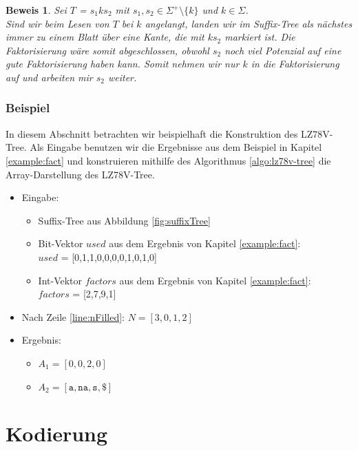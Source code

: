 \documentclass[a4paper,11pt]{scrartcl}%
\theoremstyle{change}
\theoremstyle{nonumberplain}
\theoremstyle{change}
\theoremstyle{nonumberplain}
\newtheorem{beweis}{Beweis}
\theoremstyle{change}
\theoremstyle{nonumberplain}
\begin{document}
\begin{beweis}
	Sei $T$ = $s_1ks_2$ mit $s_1,s_2 \in \Sigma^+ \setminus \{k\}$ und $k \in \Sigma$. \\
	Sind wir beim Lesen von $T$ bei $k$ angelangt, landen wir im Suffix-Tree als nächstes immer zu einem Blatt über eine Kante, die mit $ks_2$ markiert ist.
	Die Faktorisierung wäre somit abgeschlossen, obwohl $s_2$ noch viel Potenzial auf eine gute Faktorisierung haben kann. Somit nehmen wir nur $k$ in die Faktorisierung auf und arbeiten mir $s_2$ weiter.
\end{beweis}

\subsubsection{Beispiel}

In diesem Abschnitt betrachten wir beispielhaft die Konstruktion des LZ78V-Tree. Als Eingabe benutzen wir die Ergebnisse aus dem Beispiel in Kapitel \ref{example:fact} und konstruieren mithilfe des Algorithmus \ref{algo:lz78v-tree} die Array-Darstellung des LZ78V-Tree.\\

\begin{itemize}
\item Eingabe: 
	\begin{itemize}
		\item Suffix-Tree aus Abbildung \ref{fig:suffixTree}
		\item Bit-Vektor $used$ aus dem Ergebnis von Kapitel \ref{example:fact}: \\
		$used$ = [0,1,1,0,0,0,0,1,0,1,0]
		\item Int-Vektor $factors$ aus dem Ergebnis von Kapitel \ref{example:fact}: \\
		$factors$ = [2,7,9,1]
	\end{itemize}
	
\item Nach Zeile \ref{line:nFilled}: $N = [3,0,1,2]$
\item Ergebnis:
	\begin{itemize}
		\item $A_1 = [0 ,0 , 2, 0]$
		\item $A_2 = [\texttt{a}, \texttt{na}, \texttt{s}, \texttt{\$}]$
	\end{itemize}
\end{itemize}

\section{Kodierung}\label{encode}
\end{document}
